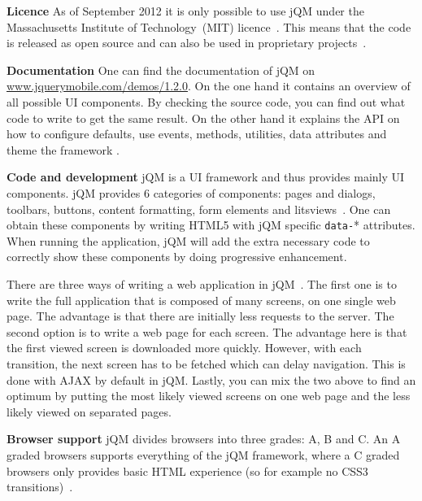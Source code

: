 \documentclass[a4paper]{artikel3}
\newcommand{\code}[1]{\texttt{#1}}
\renewcommand{\url}[1]{\href{http://#1}{#1}}
\renewcommand{\paragraph}[1]{{\bf #1} }
\begin{document}
\paragraph{Licence}
As of September 2012 it is only possible to use jQM under the Massachusetts Institute of Technology~(MIT) licence~\cite{Dmethvin2012}. 
This means that the code is released as open source and can also be used in proprietary projects~\cite{PhilDutson2012}.

\paragraph{Documentation}
One can find the documentation of jQM on \url{www.jquerymobile.com/demos/1.2.0}. On the one hand it contains an overview of all possible UI components. 
By checking the source code, you can find out what code to write to get the same result. 
On the other hand it explains the API on how to configure defaults, use events, methods, utilities, data attributes and theme the framework \cite{JQuery2012b}.

\paragraph{Code and development}
jQM is a UI framework and thus provides mainly UI components. 
jQM provides 6 categories of components: pages and dialogs, toolbars, buttons, content formatting, form elements and litsviews~\cite{JQuery2012b}. 
One can obtain these components by writing HTML5 with jQM specific \code{data-}* attributes. 
When running the application, jQM will add the extra necessary code to correctly show these components by doing progressive enhancement.

There are three ways of writing a web application in jQM~\cite{Broulik2012}. 
The first one is to write the full application that is composed of many screens, on one single web page.
The advantage is that there are initially less requests to the server.
The second option is to write a web page for each screen. 
The advantage here is that the first viewed screen is downloaded more quickly. 
However, with each transition, the next screen has to be fetched which can delay navigation.
This is done with AJAX by default in jQM.
Lastly, you can mix the two above to find an optimum by putting the most likely viewed screens on one web page and the less likely viewed on separated pages.  

\paragraph{Browser support}
\label{sec:jqm-browser-support}
jQM divides browsers into three grades: A, B and C. 
An A graded browsers supports everything of the jQM framework, where a C graded browsers only provides basic HTML experience (so for example no CSS3 transitions)~\cite{JQuery2012d}.
\end{document}
